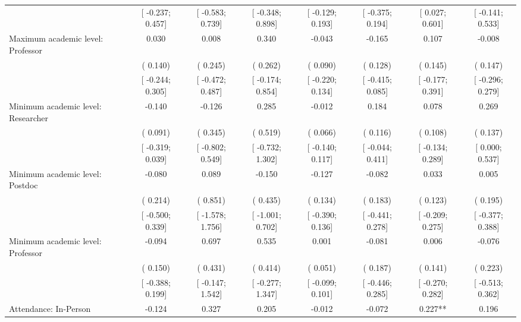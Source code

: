 \begin{tabular}{l*{7}{c}}
                    &[   -0.237;     0.457]   &[   -0.583;     0.739]   &[   -0.348;     0.898]   &[   -0.129;     0.193]   &[   -0.375;     0.194]   &[    0.027;     0.601]   &[   -0.141;     0.533]   \\
Maximum academic level: Professor &    0.030   &    0.008   &    0.340   &   -0.043   &   -0.165   &    0.107   &   -0.008   \\
                    &(    0.140)   &(    0.245)   &(    0.262)   &(    0.090)   &(    0.128)   &(    0.145)   &(    0.147)   \\
                    &[   -0.244;     0.305]   &[   -0.472;     0.487]   &[   -0.174;     0.854]   &[   -0.220;     0.134]   &[   -0.415;     0.085]   &[   -0.177;     0.391]   &[   -0.296;     0.279]   \\
Minimum academic level: Researcher &   -0.140   &   -0.126   &    0.285   &   -0.012   &    0.184   &    0.078   &    0.269   \\
                    &(    0.091)   &(    0.345)   &(    0.519)   &(    0.066)   &(    0.116)   &(    0.108)   &(    0.137)   \\
                    &[   -0.319;     0.039]   &[   -0.802;     0.549]   &[   -0.732;     1.302]   &[   -0.140;     0.117]   &[   -0.044;     0.411]   &[   -0.134;     0.289]   &[    0.000;     0.537]   \\
Minimum academic level: Postdoc &   -0.080   &    0.089   &   -0.150   &   -0.127   &   -0.082   &    0.033   &    0.005   \\
                    &(    0.214)   &(    0.851)   &(    0.435)   &(    0.134)   &(    0.183)   &(    0.123)   &(    0.195)   \\
                    &[   -0.500;     0.339]   &[   -1.578;     1.756]   &[   -1.001;     0.702]   &[   -0.390;     0.136]   &[   -0.441;     0.278]   &[   -0.209;     0.275]   &[   -0.377;     0.388]   \\
Minimum academic level: Professor &   -0.094   &    0.697   &    0.535   &    0.001   &   -0.081   &    0.006   &   -0.076   \\
                    &(    0.150)   &(    0.431)   &(    0.414)   &(    0.051)   &(    0.187)   &(    0.141)   &(    0.223)   \\
                    &[   -0.388;     0.199]   &[   -0.147;     1.542]   &[   -0.277;     1.347]   &[   -0.099;     0.101]   &[   -0.446;     0.285]   &[   -0.270;     0.282]   &[   -0.513;     0.362]   \\
Attendance: In-Person &   -0.124   &    0.327   &    0.205   &   -0.012   &   -0.072   &    0.227**   &    0.196   \\

\end{tabular}
